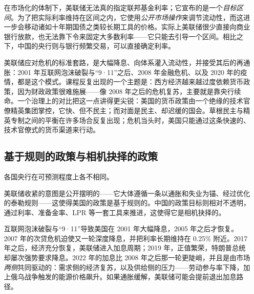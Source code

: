 
在市场化的体制下，美联储无法真的指定联邦基金利率；它宣布的是一个\emph{目标区间}。为了把实际利率维持在区间之内，它使用\emph{公开市场操作}来调节流动性，而这进一步会移动诸如十年期国债之类较长期工具的价格。实际上美联储很少直接向商业银行放款，也无法靠下令来固定大多数利率——它只能去引导一个区间。相比之下，中国的央行则与银行频繁交易，可以直接确定利率。

\begin{remark}[应对危机与对货币政策的过度依赖]
美联储应对危机的标准套路，是大幅降息、向体系灌入流动性，并接受其后的再通胀：2001 年互联网泡沫破裂与“9·11”之后、2008 年金融危机、以及 2020 年的疫情，都是这个模式。课程反复出现的一个主题是：西方经济越来越过度依赖货币政策，因为财政政策很难施展——像 2008 年之后的危机复苏，主要就是靠央行续命。一个治理上的对比把这一点讲得更尖锐：美国的货币政策由一个绝缘的技术官僚精英集团掌控，它快、但不民主；而对面是民主、却迟缓的国会。草根民主与精英专制之间的平衡在许多场合反复出现；危机当头时，美国只能通过这条快速的、技术官僚式的货币渠道来行动。
\end{remark}

\subsection{基于规则的政策与相机抉择的政策}

各国央行在可预测程度上各不相同。


美联储收紧的意图是公开摆明的——它大体遵循一条以通胀和失业为锚、经过优化的泰勒规则——这使得美国的政策是基于规则的。中国的政策目标则相对不透明，通过利率、准备金率、LPR 等一套工具来推进，这使得它是相机抉择的。

\begin{remark}[近年美联储周期的一条粗略时间线]
互联网泡沫破裂与“9·11”导致美国在 2001 年大幅降息，2005 年之后才恢复。2007 年的次贷危机迫使又一轮深度降息，并把利率长期维持在 0.25\% 附近。2017 年之后，经济充分恢复，美联储进入加息周期；2019 年，正值繁荣，特朗普总统却屡次强势要求降息。2022 年的加息比 2008 年之后那一轮更陡峭，并且是由市场\emph{两侧}共同驱动的：需求侧的经济复苏，以及供给侧的压力——劳动参与率下降，加上俄乌战争触发的能源价格飙升。如果通胀缓解，美联储可能会提前退出加息路径。
\end{remark}

